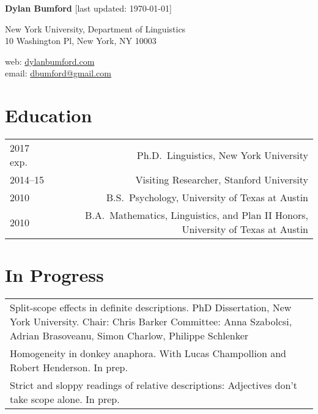 \documentclass[12pt]{article}
\renewcommand{\arraystretch}{1.5} %
\begin{document}
\textbf{Dylan Bumford}\hfill
{\color{gray}[last updated: \today]}

\bigskip

\begin{minipage}[t]{0.55\textwidth}
New York University, Department of Linguistics\\
10 Washington Pl, New York, NY 10003
\end{minipage}
\begin{minipage}[t]{\linegoal}
\raggedleft%
web: \url{dylanbumford.com}\\
email: \href{mailto:dbumford@gmail.com}{dbumford@gmail.com}
\end{minipage}

\bigskip

\section*{Education}

\begingroup
\renewcommand{\arraystretch}{1} %
\begin{longtable}{LR}
  2017 exp.   & Ph.D.~Linguistics, New York University\\
  2014--15    & Visiting Researcher, Stanford University\\
  2010        & B.S.~Psychology, University of Texas at Austin\\
  2010        & B.A.~Mathematics, Linguistics, and Plan II Honors, University of
                Texas at Austin
\end{longtable}
\endgroup

\bigskip

\section*{In Progress}

\begin{longtable}{@{}p{\textwidth}@{}}
  Split-scope effects in definite descriptions. PhD Dissertation, New York
  University.\newline
  Chair: Chris Barker\newline
  Committee: Anna Szabolcsi, Adrian Brasoveanu, Simon Charlow, Philippe
  Schlenker\\
  Homogeneity in donkey anaphora. With Lucas Champollion and Robert Henderson. In
  prep.\\
  Strict and sloppy readings of relative descriptions: Adjectives don't take
  scope alone. In prep.
\end{longtable}
\end{document}
